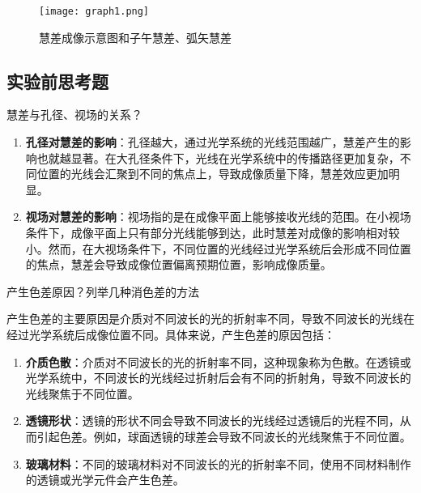 \documentclass[dvipsnames, svgnames,a4paper,11pt]{article}
\begin{document}
		\begin{figure}[htbp]
			\centering
			\texttt{[image: graph1.png]}
			\caption{慧差成像示意图和子午慧差、弧矢慧差}
			\label{fig:graph1}
		\end{figure}
	

\subsection{实验前思考题}
	\begin{question}
		慧差与孔径、视场的关系？
	\end{question}
		
		\begin{enumerate}
			\item \textbf{孔径对慧差的影响}：孔径越大，通过光学系统的光线范围越广，慧差产生的影响也就越显著。在大孔径条件下，光线在光学系统中的传播路径更加复杂，不同位置的光线会汇聚到不同的焦点上，导致成像质量下降，慧差效应更加明显。

			\item \textbf{视场对慧差的影响}：视场指的是在成像平面上能够接收光线的范围。在小视场条件下，成像平面上只有部分光线能够到达，此时慧差对成像的影响相对较小。然而，在大视场条件下，不同位置的光线经过光学系统后会形成不同位置的焦点，慧差会导致成像位置偏离预期位置，影响成像质量。
		\end{enumerate}
		
			
		
		
		
		
		

	\begin{question}
		产生色差原因？列举几种消色差的方法
	\end{question}

	产生色差的主要原因是介质对不同波长的光的折射率不同，导致不同波长的光线在经过光学系统后成像位置不同。具体来说，产生色差的原因包括：
	\begin{enumerate}
		\item \textbf{介质色散}：介质对不同波长的光的折射率不同，这种现象称为色散。在透镜或光学系统中，不同波长的光线经过折射后会有不同的折射角，导致不同波长的光线聚焦于不同位置。
		\item \textbf{透镜形状}：透镜的形状不同会导致不同波长的光线经过透镜后的光程不同，从而引起色差。例如，球面透镜的球差会导致不同波长的光线聚焦于不同位置。
		\item \textbf{玻璃材料}：不同的玻璃材料对不同波长的光的折射率不同，使用不同材料制作的透镜或光学元件会产生色差。
	\end{enumerate}
	
\end{document}
